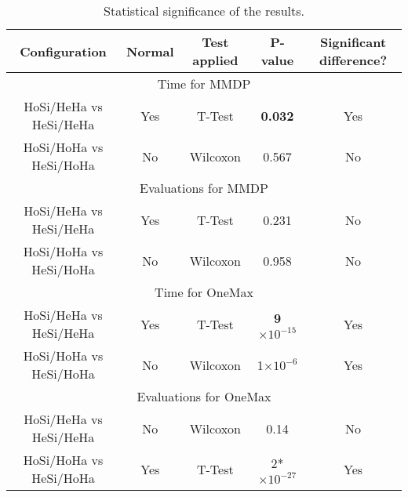 \documentclass{sig-alternate}
\providecommand{\e}[1]{\ensuremath{\times 10^{#1}}}
\begin{document}
\begin{table*}
\centering
\caption{Statistical significance of the results.}
\begin{tabular}{|c|c|c|c|c|} \hline

Configuration			&Normal	&Test applied			&P-value & Significant difference?\\ \hline
\multicolumn{5}{|c|}{Time for MMDP} \\ \hline
HoSi/HeHa vs HeSi/HeHa	&Yes	&T-Test			& \textbf{0.032} 	 & Yes \\ \hline
HoSi/HoHa vs HeSi/HoHa	&No		&Wilcoxon		&0.567 	 & No \\ \hline
\multicolumn{5}{|c|}{Evaluations for MMDP}	\\ \hline
HoSi/HeHa vs HeSi/HeHa	&Yes	&T-Test			&0.231  & No \\ \hline
HoSi/HoHa vs HeSi/HoHa	&No		&Wilcoxon		&0.958  & No \\ \hline
\multicolumn{5}{|c|}{Time for OneMax} \\ \hline
HoSi/HeHa vs HeSi/HeHa	& Yes	& T-Test		&  \textbf{9\e{-15}} & Yes \\ \hline
HoSi/HoHa vs HeSi/HoHa	& No	& Wilcoxon		& 	1\e{-6} & Yes \\ \hline
\multicolumn{5}{|c|}{Evaluations for OneMax}	\\ \hline
HoSi/HeHa vs HeSi/HeHa	& No	& Wilcoxon 		&	0.14 		& No\\ \hline
HoSi/HoHa vs HeSi/HoHa	& Yes	& T-Test		&	2*\e{-27}	& Yes \\ \hline
\end{tabular}
\label{tab:significance}
\end{table*}



%
\end{document}
